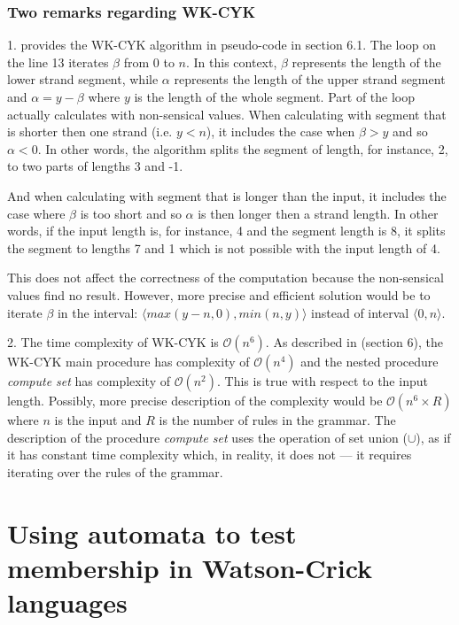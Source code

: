 \subsubsection{Two remarks regarding WK-CYK}
1. \cite{WK_CYK} provides the WK-CYK algorithm in pseudo-code in section 6.1. The loop on the line 13 iterates $\beta$ from 0 to $n$. In this context, $\beta$ represents the length of the lower strand segment, while $\alpha$ represents the length of the upper strand segment and $\alpha = y - \beta$ where $y$ is the length of the whole segment. Part of the loop actually calculates with non-sensical values. When calculating with segment that is shorter then one strand (i.e. $y < n$), it includes the case when $\beta > y$ and so $\alpha < 0$. In other words, the algorithm splits the segment of length, for instance, 2, to two parts of lengths 3 and -1.

And when calculating with segment that is longer than the input, it includes the case where $\beta$ is too short and so $\alpha$ is then longer then a strand length. In other words, if the input length is, for instance, 4 and the segment length is 8, it splits the segment to lengths 7 and 1 which is not possible with the input length of 4.

This does not affect the correctness of the computation because the non-sensical values find no result. However, more precise and efficient solution would be to iterate $\beta$ in the interval: $\langle max(y-n, 0), min(n, y)\rangle$ instead of interval $\langle 0, n\rangle$.

\medskip

2. The time complexity of WK-CYK is $\mathcal{O}(n^6)$. As described in \cite{WK_CYK} (section 6), the WK-CYK main procedure has complexity of $\mathcal{O}(n^4)$ and the nested procedure \textit{compute set} has complexity of $\mathcal{O}(n^2)$. This is true with respect to the input length. Possibly, more precise description of the complexity would be $\mathcal{O}(n^6 \times R)$ where $n$ is the input and $R$ is the number of rules in the grammar. The description of the procedure \textit{compute set} uses the operation of set union ($\cup$), as if it has constant time complexity which, in reality, it does not --- it requires iterating over the rules of the grammar.

\section{Using automata to test membership in Watson-Crick languages}

